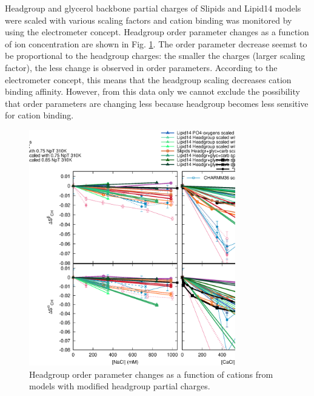 \documentclass[aip,jcp]{revtex4}
\begin{document}
Headgroup and glycerol backbone partial charges of Slipids and Lipid14 models were scaled
with various scaling factors and cation binding was monitored by using the electrometer
concept. Headgroup order parameter changes as a function of ion concentration are
shown in Fig. \ref{OrderParameterIONSchangesSCALED}. The order parameter decrease
seemst to be proportional to the headgroup charges: the smaller the charges
(larger scaling factor), the less change is observed in order parameters.
According to the electrometer concept, this means that the headgroup scaling
decreases cation binding affinity. However, from this data only we cannot
exclude the possibility that order parameters are changing less because
headgroup becomes less sensitive for cation binding.
\begin{figure}[]
  \centering
  \includegraphics[width=9.0cm]{../Fig/OrderParameterIONSchangesSCALED.eps}
  \caption{\label{OrderParameterIONSchangesSCALED}
    Headgroup order parameter changes as a function of cations from models
    with modified headgroup partial charges.}
\end{figure}
\end{document}
